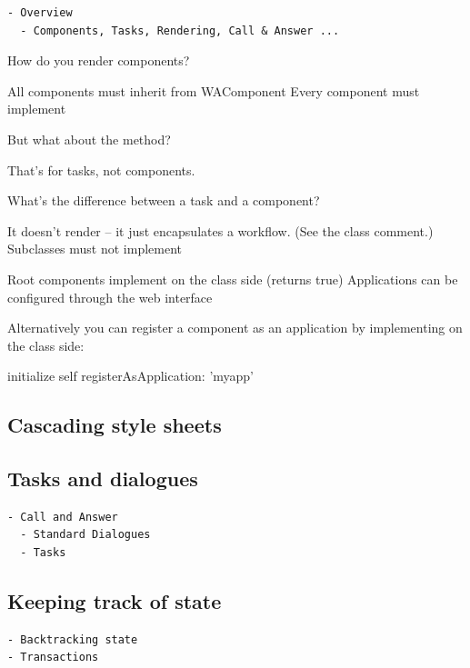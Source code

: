 \documentclass[a4paper,10pt,twoside]{book}
\begin{document}
\begin{verbatim}
- Overview
  - Components, Tasks, Rendering, Call & Answer ...
\end{verbatim}

\begin{faq}
How do you render components?
\end{faq}
\answer
All components must inherit from WAComponent
Every component must implement 

\begin{faq}
But what about the  method?
\end{faq}
\answer
That's for tasks, not components.

\begin{faq}
What's the difference between a task and a component?
\end{faq}
\answer
It doesn't render -- it just encapsulates a workflow.
(See the class comment.)
Subclasses must not implement 

Root components implement  on the class side (returns true)
Applications can be configured through the web interface

Alternatively you can register a component as an application by implementing  on the class side:
\begin{code}
initialize
	self registerAsApplication: 'myapp'
\end{code}


\subsection{Cascading style sheets}

\subsection{Tasks and dialogues}
\begin{verbatim}
- Call and Answer
  - Standard Dialogues
  - Tasks
\end{verbatim}
\subsection{Keeping track of state}
\begin{verbatim}
- Backtracking state
- Transactions
\end{verbatim}
\end{document}
